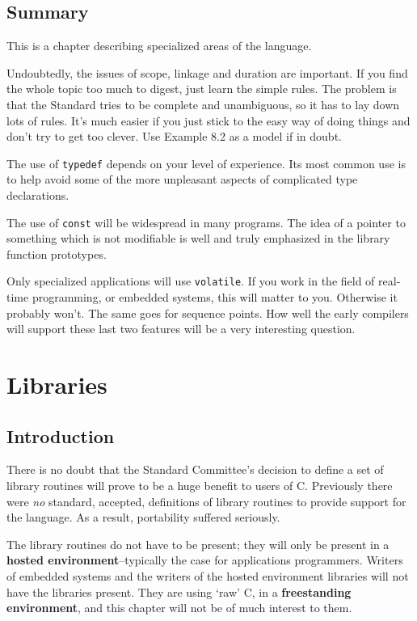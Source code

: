  
        \section{Summary}
        


  This is a chapter describing specialized areas of the language.


  Undoubtedly, the issues of scope, linkage and duration are important.
   If you find the whole topic too much to digest, just learn the simple
   rules. The problem is that the Standard tries to be complete and
   unambiguous, so it has to lay down lots of rules. It's much easier if
   you just stick to the easy way of doing things and don't try to get
   too clever. Use Example 8.2 as a model if in doubt.


  The use of \texttt{typedef} depends on your level of experience.
   Its most common use is to help avoid some of the more unpleasant aspects
   of complicated type declarations.


  The use of \texttt{const} will be widespread in many programs.
   The idea of a pointer to something which is not modifiable is well and
   truly emphasized in the library function prototypes.


  Only specialized applications will use \texttt{volatile}. If you
   work in the field of real-time programming, or embedded systems, this
   will matter to you. Otherwise it probably won't. The same goes for
   sequence points. How well the early compilers will support these last
   two features will be a very interesting question.


 \chapter{Libraries}


        \section{Introduction}
        

  

  There is no doubt that the Standard Committee's decision to
   define a set of library routines will prove to be a huge
   benefit to users of C.  Previously there were \textit{no} standard,
   accepted, definitions of library routines to provide support
   for the language.  As a result, portability suffered
   seriously.


  The library routines do not have to be present; they will
   only be present in a \textbf{hosted environment}--typically the case
   for applications programmers.  Writers of embedded systems
   and the writers of the hosted environment libraries will not
   have the libraries present.  They are using `raw' C, in a
   \textbf{freestanding environment}, and this chapter will not be of
   much interest to them.


